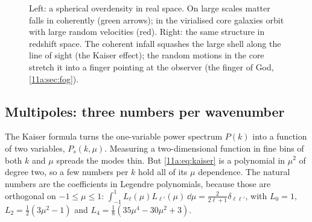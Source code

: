 \begin{figure}[htbp]
\centering
{}
\caption{Left: a spherical overdensity in real space. On large scales matter
falls in coherently (green arrows); in the virialised core galaxies orbit with
large random velocities (red). Right: the same structure in redshift space. The
coherent infall squashes the large shell along the line of sight (the Kaiser
effect); the random motions in the core stretch it into a finger pointing at the
observer (the finger of God, \cref{11a:sec:fog}).}
\label{11a:fig:rsd-cartoon}
\end{figure}

\subsection{Multipoles: three numbers per wavenumber}
\label{11a:sec:rsd-multipoles}

The Kaiser formula turns the one-variable power spectrum $P(k)$ into a function of
two variables, $P_s(k,\mu)$. Measuring a two-dimensional function in fine bins of
both $k$ and $\mu$ spreads the modes thin. But \eqref{11a:eq:kaiser} is a
polynomial in $\mu^2$ of degree two, so a few numbers per $k$ hold all of its
$\mu$ dependence. The natural numbers are the coefficients in Legendre
polynomials, because those are orthogonal on $-1\le\mu\le1$:
$\int_{-1}^1L_\ell(\mu)L_{\ell'}(\mu)\,\dd\mu=\frac{2}{2\ell+1}\delta_{\ell\ell'}$,
with $L_0=1$, $L_2=\frac12(3\mu^2-1)$ and $L_4=\frac18(35\mu^4-30\mu^2+3)$.

